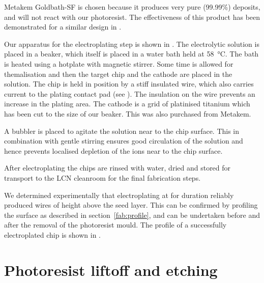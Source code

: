 {Metakem Goldbath-SF is chosen because it produces very pure (99.99\%) deposits,
and will not react with our photoresist. The effectiveness of this product has
been demonstrated for a similar design in .

Our apparatus for the electroplating step is shown in
. The electrolytic solution is placed in a
beaker, which itself is placed in a water bath held at \SI{58}{\celsius}. The
bath is heated using a hotplate with magnetic stirrer. Some time is allowed for
themalisation and then the target chip and the cathode are placed in the
solution. The chip is held in position by a stiff insulated wire, which also
carries current to the plating contact pad (see ). The insulation on the wire prevents an increase in the plating area.
The cathode is a grid of platinised titanium which has been cut to the size of
our beaker. This was also purchased from Metakem.

A bubbler is placed to agitate the solution near to the chip surface. This in
combination with gentle stirring ensures good circulation of the solution and
hence prevents localised depletion of the ions near to the chip
surface.~\cite{Schlesinger2011} 

After electroplating the chips are rinsed with  water, dried and stored
for transport to the LCN cleanroom for the final fabrication steps.

We determined experimentally that electroplating at
 for duration 
reliably produced wires of height  above the seed layer. This can be
confirmed by profiling the surface as described in
section~\ref{fab:profile}, and can be undertaken before and after the
removal of the photoresist mould. The profile of a successfully electroplated
chip is shown in .

\begin{figure}
\centering
  \caption{}
  \label{fab:fig:eplateprofile}
\end{figure}

\section{Photoresist liftoff and etching}

}
